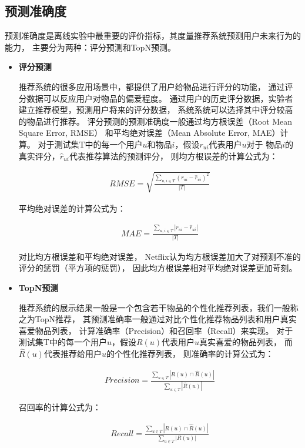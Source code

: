 \subsection{预测准确度}
预测准确度是离线实验中最重要的评价指标，其度量推荐系统预测用户未来行为的能力，
主要分为两种：评分预测和TopN预测。

\begin{itemize}
\item \textbf{评分预测}

推荐系统的很多应用场景中，都提供了用户给物品进行评分的功能，
通过评分数据可以反应用户对物品的偏爱程度。
通过用户的历史评分数据，实验者建立推荐模型，预测用户将来的评分数据，
系统系统可以选择其中评分较高的物品进行推荐。
评分预测的预测准确度一般通过均方根误差（Root Mean Square Error, RMSE）
和平均绝对误差（Mean Absolute Error, MAE）计算。
对于测试集T中的每一个用户$u$和物品$i$，假设$r_{ui}$代表用户$u$对于
物品$i$的真实评分，$\hat{r}_{ui}$代表推荐算法的预测评分，
则均方根误差的计算公式为：

\begin{equation}
\begin{split}
RMSE = \sqrt{\frac{\sum_{u,i \in T}{(r_{ui} - \hat{r}_{ui})^2}}{|T|}}
\end{split}
\end{equation}

平均绝对误差的计算公式为：

\begin{equation}
\begin{split}
MAE = \frac{\sum_{u,i \in T}{|r_{ui} - \hat{r}_{ui}|}}{|T|}
\end{split}
\end{equation}

对比均方根误差和平均绝对误差，
Netflix认为均方根误差加大了对预测不准的评分的惩罚（平方项的惩罚），
因此均方根误差相对平均绝对误差更加苛刻。

\item \textbf{TopN预测}

推荐系统的展示结果一般是一个包含若干物品的个性化推荐列表，我们一般称之为TopN推荐，
其预测准确率一般通过对比个性化推荐物品列表和用户真实喜爱物品列表，
计算准确率（Precision）和召回率（Recall）来实现。
对于测试集T中的每一个用户$u$，假设$R(u)$代表用户$u$真实喜爱的物品列表，
而$\hat{R}(u)$代表推荐给用户$u$的个性化推荐列表，
则准确率的计算公式为：

\begin{equation}
\begin{split}
Precision = \frac{ \sum_{u \in T}{|R(u) \cap \hat{R}(u)|} }{ \sum_{u \in T}{|\hat{R}(u)|} }
\end{split}
\end{equation}

召回率的计算公式为：

\begin{equation}
\begin{split}
Recall = \frac{ \sum_{u \in T}{|R(u) \cap \hat{R}(u)|} }{ \sum_{u \in T}{|R(u)|} }
\end{split}
\end{equation}

\end{itemize}

